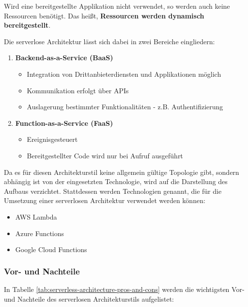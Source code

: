     Wird eine bereitgestellte Applikation nicht verwendet, so werden auch keine Ressourcen benötigt. Das heißt, \textbf{Ressourcen werden dynamisch bereitgestellt}.

    Die serverlose Architektur lässt sich dabei in zwei Bereiche eingliedern:
    \begin{enumerate}
        \item \textbf{Backend-as-a-Service (BaaS)}
        \begin{itemize}[label=$\circ$]
            \item Integration von Drittanbieterdiensten und Applikationen möglich
            \item Kommunikation erfolgt über APIs
            \item Auslagerung bestimmter Funktionalitäten - z.B. Authentifizierung
        \end{itemize}
        
        \item \textbf{Function-as-a-Service (FaaS)}
        \begin{itemize}[label=$\circ$]
            \item Ereignisgesteuert
            \item Bereitgestellter Code wird nur bei Aufruf ausgeführt
        \end{itemize}
    \end{enumerate}

    Da es für diesen Architekturstil keine allgemein gültige Topologie gibt, sondern abhängig ist von der eingesetzten Technologie, wird auf die Darstellung des Aufbaus verzichtet. Stattdessen werden Technologien genannt, die für die Umsetzung einer serverlosen Architektur verwendet werden können:
    \begin{itemize}
        \item AWS Lambda
        \item Azure Functions
        \item Google Cloud Functions
    \end{itemize}
    \cite{EA:Web65}
    
    \clearpage


        \subsubsection{Vor- und Nachteile}

        In Tabelle \ref{tab:serverless-architecture-pros-and-cons} werden die wichtigsten Vor- und Nachteile des serverlosen Architekturstils aufgelistet:
    
